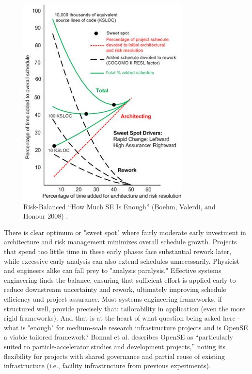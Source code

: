 \begin{figure}[h]
  \centering
  \includegraphics[width=0.7\linewidth]{figures/P1_EconValueSE_RiskBalancedfig2_BB.jpg}
  \caption{Risk-Balanced “How Much SE Is Enough” (Boehm, Valerdi, and Honour 2008)
  \cite{sebok_economic_value}.}
  \label{fig:enoughSE}
\end{figure}

There is clear optimum or "sweet spot" where fairly moderate early investment in architecture and risk management minimizes overall schedule growth. 
Projects that spend too little time in these early phases face substantial rework later, while excessive early analysis can also extend schedules unnecessarily. Physicist and engineers alike can fall prey to "analysis paralysis."
Effective systems engineering finds the balance, ensuring that sufficient effort is applied early to reduce downstream uncertainty and rework, ultimately improving schedule efficiency and project assurance.
Most systems engineering frameworks, if structured well, provide precisely that: tailorability in application (even the more rigid frameworks). 
And that is at the heart of what question being asked here - what is "enough" for medium-scale research infrastructure projects and is OpenSE a viable tailored framework? 
Bonnal et al.\cite{bonnal2018opense} describes OpenSE as “particularly suited to particle-accelerator studies and development projects,” noting its flexibility for projects with shared governance and partial reuse of existing infrastructure (i.e., facility infrastructure from previous experiments).


